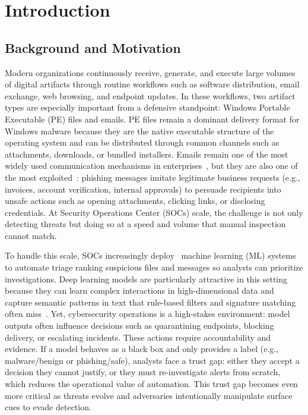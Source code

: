 \documentclass[conference]{IEEEtran}
\begin{document}
\section{Introduction}

\subsection{Background and Motivation}

Modern organizations continuously receive, generate, and execute large volumes of digital artifacts through routine workflows such as software distribution, email exchange, web browsing, and endpoint updates. In these workflows, two artifact types are especially important from a defensive standpoint: Windows Portable Executable (PE) files and emails. PE files remain a dominant delivery format for Windows malware because they are the native executable structure of the operating system and can be distributed through common channels such as attachments, downloads, or bundled installers. Emails remain one of the most widely used communication mechanisms in enterprises~\cite{TRG2024-28}, but they are also one of the most exploited~\cite{DBIR2025}: phishing messages imitate legitimate business requests (e.g., invoices, account verification, internal approvals) to persuade recipients into unsafe actions such as opening attachments, clicking links, or disclosing credentials. At Security Operations Center (SOCs) scale, the challenge is not only detecting threats but doing so at a speed and volume that manual inspection cannot match.

To handle this scale, SOCs increasingly deploy~\cite{SDRS2025} machine learning (ML) systems to automate triage ranking suspicious files and messages so analysts can prioritize investigations. Deep learning models are particularly attractive in this setting because they can learn complex interactions in high-dimensional data and capture semantic patterns in text that rule-based filters and signature matching often miss~\cite{DSR2025ai}. Yet, cybersecurity operations is a high-stakes environment: model outputs often influence decisions such as quarantining endpoints, blocking delivery, or escalating incidents. These actions require accountability and evidence. If a model behaves as a black box and only provides a label (e.g., malware/benign or phishing/safe), analysts face a trust gap: either they accept a decision they cannot justify, or they must re-investigate alerts from scratch, which reduces the operational value of automation. This trust gap becomes even more critical as threats evolve and adversaries intentionally manipulate surface cues to evade detection.
\end{document}
